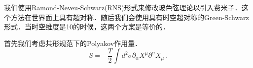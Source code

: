 
我们使用Ramond-Neveu-Schwarz(RNS)形式来修改玻色弦理论以引入费米子．这个方法在世界面上具有超对称．随后我们会使用具有时空超对称的Green-Schwarz形式．当时空维度是10的时候，这两个方案是等价的．

首先我们考虑共形规范下的Polyakov作用量．
\begin{equation}
S = - \frac{T}{2} \int d^2 \sigma \partial_\alpha X^\mu \partial^\alpha X_\mu~.
\end{equation}

